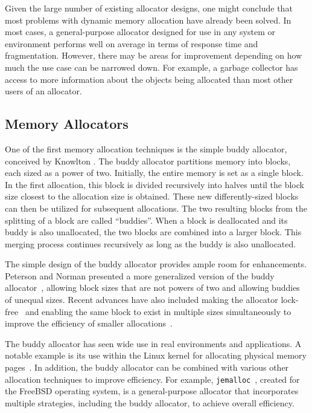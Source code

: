Given the large number of existing allocator designs, one might conclude that most problems with dynamic memory allocation have already been solved. In most cases, a general-purpose allocator designed for use in any system or environment performs well on average in terms of response time and fragmentation. However, there may be areas for improvement depending on how much the use case can be narrowed down. For example, a garbage collector has access to more information about the objects being allocated than most other users of an allocator.

\subsection{Memory Allocators}

One of the first memory allocation techniques is the simple buddy allocator, conceived by Knowlton \cite{buddy}. The buddy allocator partitions memory into blocks, each sized as a power of two. Initially, the entire memory is set as a single block. In the first allocation, this block is divided recursively into halves until the block size closest to the allocation size is obtained. These new differently-sized blocks can then be utilized for subsequent allocations. The two resulting blocks from the splitting of a block are called ``buddies''. When a block is deallocated and its buddy is also unallocated, the two blocks are combined into a larger block. This merging process continues recursively as long as the buddy is also unallocated.

The simple design of the buddy allocator provides ample room for enhancements. Peterson and Norman presented a more generalized version of the buddy allocator~\cite{genbuddy}, allowing block sizes that are not powers of two and allowing buddies of unequal sizes. Recent advances have also included making the allocator lock-free~\cite{nbbs} and enabling the same block to exist in multiple sizes simultaneously to improve the efficiency of smaller allocations~\cite{park2014ibuddy}.

The buddy allocator has seen wide use in real environments and applications. A notable example is its use within the Linux kernel for allocating physical memory pages~\cite{linuxbuddy}. In addition, the buddy allocator can be combined with various other allocation techniques to improve efficiency. For example, \texttt{jemalloc}~\cite{jemalloc}, created for the FreeBSD operating system, is a general-purpose allocator that incorporates multiple strategies, including the buddy allocator, to achieve overall efficiency.

